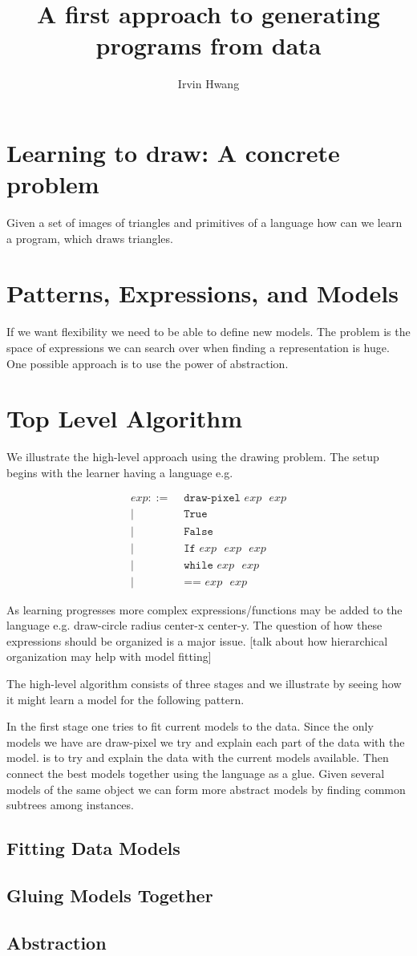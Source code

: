\documentclass[a4paper,12pt]{article}
\begin{document}
\title{A first approach to generating programs from data}
\author{Irvin Hwang}
\maketitle

\section{Learning to draw: A concrete problem}
Given a set of images of triangles and primitives of a language how can we learn a program, which draws triangles.
\section{Patterns, Expressions, and Models}
If we want flexibility we need to be able to define new models.  The problem is the space of expressions we can search over when finding a representation is huge.  One possible approach is to use the power of abstraction.  
\section{Top Level Algorithm}
We illustrate the high-level approach using the drawing problem.  The setup begins with the learner having a language e.g.

\begin{align*}
exp ::= &\texttt{ draw-pixel } exp \texttt{ }exp \\
    |& \texttt{ True} \\
    |& \texttt{ False} \\
    |& \texttt{ If } exp \texttt{ }exp \texttt{ } exp \\
    |& \texttt{ while } exp \texttt{ } exp \\
    |& \texttt{ == }exp \texttt{ }exp
\end{align*}

As learning progresses more complex expressions/functions may be added to the language e.g. draw-circle radius center-x center-y.  The question of how these expressions should be organized is a major issue.  [talk about how hierarchical organization may help with model fitting]

The high-level algorithm consists of three stages and we illustrate by seeing how it might learn a model for the following pattern.  



In the first stage one tries to fit current models to the data. Since the only models we have are draw-pixel we try and explain each part of the data with the model.      is to try and explain the data with the current models available.  Then connect the best models together using the language as a glue.  Given several models of the same object we can form more abstract models by finding common subtrees among instances.
\subsection{Fitting Data Models}

\subsection{Gluing Models Together}
\subsection{Abstraction}


\end{document}
